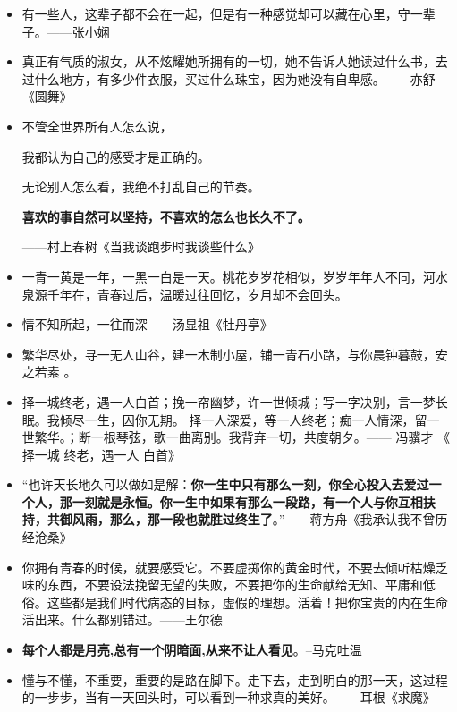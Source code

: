\documentclass[UTF8,a4paper,8pt]{ctexart}
\begin{document}
\begin{itemize}
 	\item 有一些人，这辈子都不会在一起，但是有一种感觉却可以藏在心里，守一辈子。——张小娴
 	
 	\item 真正有气质的淑女，从不炫耀她所拥有的一切，她不告诉人她读过什么书，去过什么地方，有多少件衣服，买过什么珠宝，因为她没有自卑感。——亦舒《圆舞》
 	
 	\item 不管全世界所有人怎么说，
 	
 	我都认为自己的感受才是正确的。
 	
 	无论别人怎么看，我绝不打乱自己的节奏。
 	
 	\textbf{喜欢的事自然可以坚持，不喜欢的怎么也长久不了。}
 	
 	——村上春树《当我谈跑步时我谈些什么》
 	
 	\item 一青一黄是一年，一黑一白是一天。桃花岁岁花相似，岁岁年年人不同，河水泉源千年在，青春过后，温暖过往回忆，岁月却不会回头。
 	
 	\item 情不知所起，一往而深——汤显祖《牡丹亭》
 	
 	\item 繁华尽处，寻一无人山谷，建一木制小屋，铺一青石小路，与你晨钟暮鼓，安之若素 。
 	
 	\item 择一城终老，遇一人白首；挽一帘幽梦，许一世倾城；写一字决别，言一梦长眠。我倾尽一生，囚你无期。 择一人深爱，等一人终老；痴一人情深，留一世繁华。；断一根琴弦，歌一曲离别。我背弃一切，共度朝夕。—— 冯骥才 《 择一城 终老，遇一人 白首》
 	
 	\item “也许天长地久可以做如是解：\textbf{你一生中只有那么一刻，你全心投入去爱过一个人，那一刻就是永恒。你一生中如果有那么一段路，有一个人与你互相扶持，共御风雨，那么，那一段也就胜过终生了}。”——蒋方舟《我承认我不曾历经沧桑》
 	
 	\item 你拥有青春的时候，就要感受它。不要虚掷你的黄金时代，不要去倾听枯燥乏味的东西，不要设法挽留无望的失败，不要把你的生命献给无知、平庸和低俗。这些都是我们时代病态的目标，虚假的理想。活着！把你宝贵的内在生命活出来。什么都别错过。——王尔德
 	
 	\item \textbf{每个人都是月亮,总有一个阴暗面,从来不让人看见}。--马克吐温
 	
 	\item 懂与不懂，不重要，重要的是路在脚下。走下去，走到明白的那一天，这过程的一步步，当有一天回头时，可以看到一种求真的美好。——耳根《求魔》
 	

\end{itemize}
\end{document}
